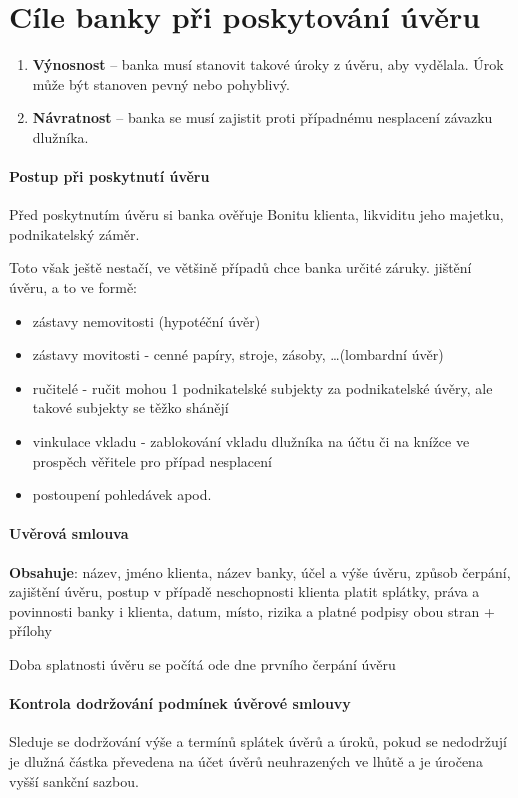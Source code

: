 \section{Cíle banky při poskytování úvěru}
\begin{enumerate}
    \item \textbf{Výnosnost} -- banka musí stanovit takové úroky z úvěru, aby vydělala. Úrok může být stanoven pevný nebo pohyblivý.
    \item \textbf{Návratnost} -- banka se musí zajistit proti případnému nesplacení závazku dlužníka.    
\end{enumerate}

\paragraph{Postup při poskytnutí úvěru}
Před poskytnutím úvěru si banka ověřuje Bonitu klienta, likviditu jeho majetku, podnikatelský záměr.

Toto však ještě nestačí, ve většině případů chce banka určité záruky. jištění úvěru, a to ve formě:
\begin{itemize}
    \item zástavy nemovitosti (hypotéční úvěr)
    \item zástavy movitosti - cenné papíry, stroje, zásoby, \ldots (lombardní úvěr)
    \item ručitelé - ručit mohou 1 podnikatelské subjekty za podnikatelské úvěry, ale takové subjekty se těžko shánějí
    \item vinkulace vkladu - zablokování vkladu dlužníka na účtu či na knížce ve prospěch věřitele pro případ nesplacení
    \item postoupení pohledávek apod.
\end{itemize}

\paragraph{Uvěrová smlouva}
\textbf{Obsahuje}: název, jméno klienta, název banky, účel a výše úvěru, způsob čerpání, zajištění úvěru, postup v případě neschopnosti klienta platit splátky, práva a povinnosti banky i klienta, datum, místo, rizika a platné podpisy obou stran + přílohy

Doba splatnosti úvěru se počítá ode dne prvního čerpání úvěru

\paragraph{Kontrola dodržování podmínek úvěrové smlouvy}
Sleduje se dodržování výše a termínů splátek úvěrů a úroků, pokud se nedodržují je dlužná částka převedena na účet úvěrů neuhrazených ve lhůtě a je úročena vyšší sankční sazbou.

